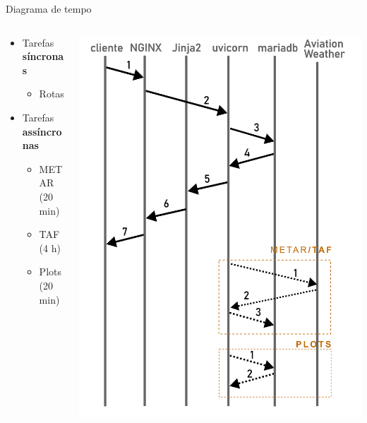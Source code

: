 \documentclass{beamer}
\begin{document}
\begin{frame}{Diagrama de tempo}
    \begin{columns}
        \begin{column}{0.5\textwidth}
            \begin{itemize}
                \item Tarefas \textbf{síncronas}
                    \begin{itemize}
                        \item Rotas
                    \end{itemize}
                \pause
                \item Tarefas \textbf{assíncronas}
                    \begin{itemize}
                        \item METAR (20 min)
                        \item TAF (4 h)
                        \item Plots (20 min)
                    \end{itemize}
            \end{itemize}
        \end{column}
        \pause
        \begin{column}{0.5\textwidth}
            \includegraphics[width=0.9\linewidth]{img/diagrama-tempo.png}
        \end{column}
    \end{columns}
\end{frame}
\end{document}
